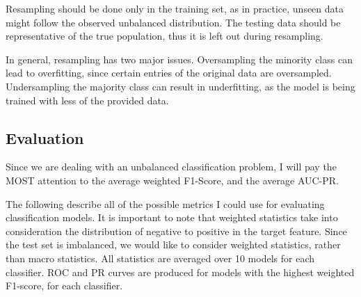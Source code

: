 \documentclass{article}
\begin{document}
Resampling should be done only in the training set, as in practice, unseen data might follow the observed unbalanced distribution. The testing data should be representative of the true population, thus it is left out during resampling.

In general, resampling has two major issues. Oversampling the minority class can lead to overfitting, since certain entries of the original data are oversampled. Undersampling the majority class can result in underfitting, as the model is being trained with less of the provided data.

\subsection{Evaluation}

Since we are dealing with an unbalanced classification problem, I will pay the MOST attention to the average weighted F1-Score, and the average AUC-PR.

The following describe all of the possible metrics I could use for evaluating classification models. It is important to note that weighted statistics take into consideration the distribution of negative to positive in the target feature. Since the test set is imbalanced, we would like to consider weighted statistics, rather than macro statistics. All statistics are averaged over 10 models for each classifier. ROC and PR curves are produced for models with the highest weighted F1-score, for each classifier.
\end{document}
